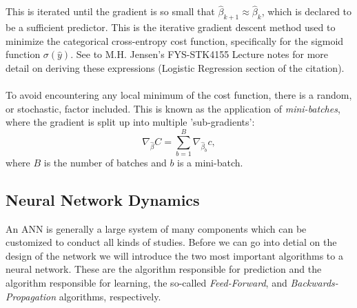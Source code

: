             This is iterated until the gradient is so small that $\hat{\beta}_{k+1} \approx \hat{\beta}_k$, which is declared to be a sufficient predictor. This is the iterative gradient descent method used to minimize the categorical cross-entropy cost function, specifically for the sigmoid function $\sigma (\hat{y})$. See to M.H. Jensen's FYS-STK4155 Lecture notes for more detail on deriving these expressions \cite{lecturenotes} (Logistic Regression section of the citation).\\\\
            To avoid encountering any local minimum of the cost function, there is a random, or stochastic, factor included. This is known as the application of \textit{mini-batches}, where the gradient is split up into multiple 'sub-gradients':
            \begin{equation}
                \nabla_{\hat{\beta}} C = \sum^{B}_{b=1} \nabla_{\hat{\beta}_b} c,
            \end{equation}
            where $B$ is the number of batches and $b$ is a mini-batch. %
    
    \subsection{Neural Network Dynamics}
        An ANN is generally a large system of many components which can be customized to conduct all kinds of studies. Before we can go into detial on the design of the network we will introduce the two most important algorithms to a neural network.
        These are the algorithm responsible for prediction and the algorithm responsible for learning, the so-called \textit{Feed-Forward}, and \textit{Backwards-Propagation} algorithms, respectively.
